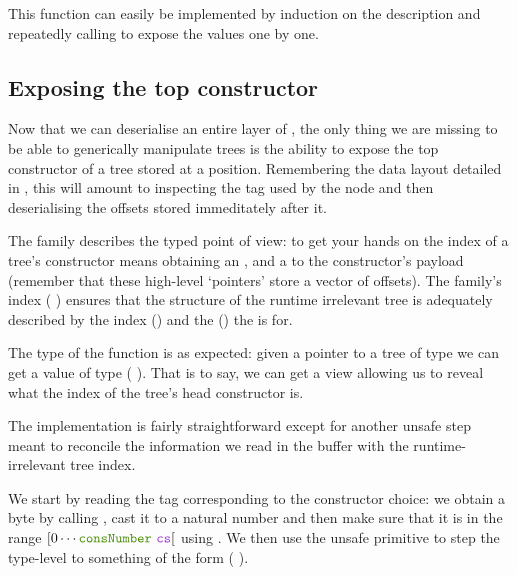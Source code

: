 
This function can easily be implemented by induction on the description
and repeatedly calling  to expose the values one by
one.


\subsection{Exposing the top constructor}

Now that we can deserialise an entire layer of ,
the only thing we are missing to be able to generically manipulate trees
is the ability to expose the top constructor of a tree stored at a
 position.
%
Remembering the data layout detailed in , this will
amount to inspecting the tag used by the node and then deserialising the
offsets stored immeditately after it.

The  family describes the typed point of view:
to get your hands on the index of a tree's constructor means
obtaining an ,
and a  to the constructor's payload
(remember that these high-level `pointers' store a vector of offsets).
%
The family's index ( \IdrisData{\#} )
ensures that the structure of the runtime irrelevant
tree is adequately described by
the index () and
the  () the  is for.


The type of the  function is as expected: given a pointer
to a tree  of type  we can get a value
of type (  ).
%
That is to say, we can get a view allowing us to reveal what the
index of the tree's head constructor is.


The implementation is fairly straightforward except for another
unsafe step meant to reconcile the information we read in the buffer
with the runtime-irrelevant tree index.


We start by reading the tag 
corresponding to the constructor choice:
we obtain a byte by calling , cast it to a
natural number and then make sure that it is in the range
$[0 \cdots \text{\IdrisFunction{consNumber} \IdrisBound{cs}}[$ using
.
%
We then use the unsafe  primitive to step the
type-level  to something of the form
( \IdrisData{\#} ).

